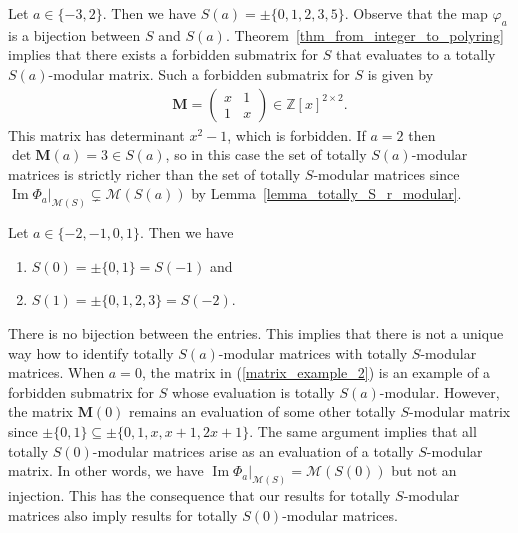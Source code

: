\documentclass[a4paper, 11pt]{article}
\DeclareMathOperator{\Ima}{Im}
\newcommand{\Z}{\mathbb{Z}}
\newcommand{\bM}{\bm{M}}
\newcommand{\indet}{x}
\newcommand{\intvar}{a}
\newcommand{\polyring}{\Z[\indet]}
\newcommand{\polyS}{S}
\newcommand{\polyM}{\bM}
\begin{document}
		Let $\intvar \in\lbrace -3,2\rbrace$. Then we have $S(\intvar) = \pm\lbrace 0,1,2,3,5\rbrace$. Observe that the map $\varphi_{\intvar}$ is a bijection between $\polyS$ and $S(\intvar)$. Theorem~\ref{thm_from_integer_to_polyring} implies that there exists a forbidden submatrix for $\polyS$ that evaluates to a totally $S(\intvar)$-modular matrix. Such a forbidden submatrix for $\polyS$ is given by
		\begin{align}
			\label{matrix_example_2}
			\polyM = \begin{pmatrix}
				x & 1 \\ 
				1 & x
			\end{pmatrix}\in\polyring^{2\times 2}.
		\end{align}
		This matrix has determinant $x^2-1$, which is forbidden. If $\intvar=2$ then $\det\bM(\intvar) = 3\in S(\intvar)$, so in this case the set of totally $S(\intvar)$-modular matrices is strictly richer than the set of totally $\polyS$-modular matrices since $\Ima\Phi_{\intvar}|_{\mathcal{M}(\polyS)}\subsetneq \mathcal{M}(S(\intvar))$ by Lemma~\ref{lemma_totally_S_r_modular}.
		
		Let $\intvar\in\lbrace -2,-1,0,1\rbrace$. Then we have 
		\begin{enumerate}
			\item $S(0) = \pm \lbrace 0,1\rbrace = S(-1)$ and
			\item $S(1) = \pm\lbrace 0,1,2,3\rbrace = S(-2)$.
		\end{enumerate}
		There is no bijection between the entries. This implies that there is not a unique way how to identify totally $S(\intvar)$-modular matrices with totally $\polyS$-modular matrices. When $\intvar = 0$, the matrix in (\ref{matrix_example_2}) is an example of a forbidden submatrix for $\polyS$ whose evaluation is totally $S(\intvar)$-modular. However, the matrix $\bM(0)$ remains an evaluation of some other totally $\polyS$-modular matrix since $\pm \lbrace 0,1\rbrace\subseteq \pm \lbrace 0,1,\indet,\indet + 1,2\indet + 1\rbrace$. The same argument implies that all totally $S(0)$-modular matrices arise as an evaluation of a totally $\polyS$-modular matrix. In other words, we have $\Ima\Phi_{\intvar}|_{\mathcal{M}(\polyS)} = \mathcal{M}(S(0))$ but not an injection. This has the consequence that our results for totally $\polyS$-modular matrices also imply results for totally $S(0)$-modular matrices.
		
\end{document}
